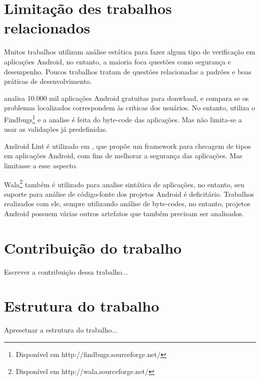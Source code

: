 \section{Limitação des trabalhos relacionados}
Muitos trabalhos utilizam análise estática para fazer algum tipo de verificação
em aplicações Android, no entanto, a maioria foca questões como segurança e
desempenho. Poucos trabalhos tratam de questões relacionadas a padrões e boas
práticas de desenvolvimento.

\cite{findbug_10k} analisa 10.000 mil aplicações Android gratuitas para donwload,
e compara se os problemas localizados correspondem às críticas dos usuários. No
entanto, utiliza o Findbugs\footnote{Disponível em http://findbugs.sourceforge.net/}
e a analise é feita do byte-code das aplicações. Mas não limita-se a usar as validações
já predefinidas.

Android Lint é utilizado em \cite{lintent}, que propõe um framework para checagem
de tipos em aplicações Android, com fins de melhorar a segurança das aplicações.
Mas limitasse a esse aspecto.

Wala\footnote{Disponível em http://wala.sourceforge.net/} também é utilizado para
analise sintática de aplicações, no entanto, seu suporte para análise de código-fonte
dos projetos Android é deficitário. Trabalhos realizados com ele, sempre utilizando
análise de byte-codes, no entanto, projetos Android possuem várias outros artefatos 
que também precisam ser analisados.

\section{Contribuição do trabalho}
Escrever a contribuição dessa trabalho...

\section{Estrutura do trabalho}
Apresetnar a estrutura do trabalho...
